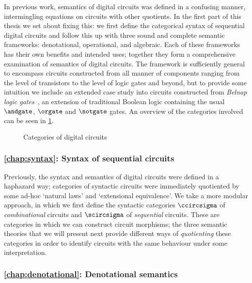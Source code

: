 In previous work, semantics of digital circuits was defined in a confusing
manner, intermingling equations on circuits with other quotients.
In the first part of this thesis we set about fixing this: we first define the
categorical syntax of sequential digital circuits and follow this up with three
sound and complete semantic frameworks: denotational, operational, and
algebraic.
Each of these frameworks has their own benefits and intended uses; together they
form a comprehensive examination of semantics of digital circuits.
The framework is sufficiently general to encompass circuits constructed from
all manner of components ranging from the level of transistors to the level of
logic gates and beyond, but to provide some intuition we
include an extended case study into circuits constructed from
\emph{Belnap logic gates}~\cite{belnap1977useful}, an extension of traditional
Boolean logic containing the usual \(\andgate\), \(\orgate\) and \(\notgate\)
gates.
An overview of the categories involved can be seen in \cref{fig:circuits-map}.

\begin{figure}
    \centering
    
    \caption{Categories of digital circuits}
    \label{fig:circuits-map}
\end{figure}

\subsubsection{\cref{chap:syntax}: Syntax of sequential circuits}

Previously, the syntax and semantics of digital circuits were defined in a
haphazard way; categories of syntactic circuits were immediately quotiented by
some ad-hoc `natural laws' and `extensional equivalence'.
We take a more modular approach, in which we first define the syntactic
categories \(\ccircsigma\) of \emph{combinational} circuits and \(\scircsigma\)
of \emph{sequential} circuits.
These are categories in which we can construct circuit morphisms; the three
semantic theories that we will present next provide different ways of
\emph{quotienting} these categories in order to identify circuits with the same
behaviour under some interpretation.

\subsubsection{\cref{chap:denotational}: Denotational semantics}

